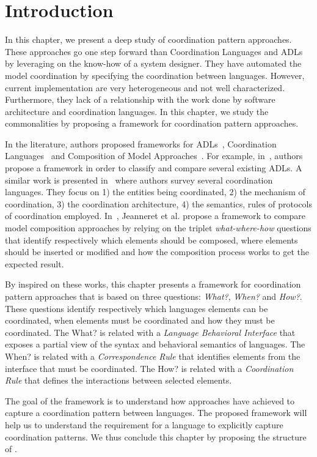 \section{Introduction}
In this chapter, we present a deep study of coordination pattern approaches. These approaches go one step forward than Coordination Languages and ADLs by leveraging on the know-how of a system designer. They have automated the model coordination by specifying the coordination between languages. However, current implementation are very heterogeneous and not well characterized. Furthermore, they lack of a relationship with the work done by software architecture and coordination languages. In this chapter, we study the commonalities by proposing a framework for coordination pattern approaches. 

In the literature, authors proposed frameworks for ADLs~\cite{frameadlsbib}, Coordination Languages~\cite{coordmodels} and Composition of Model Approaches~\cite{framecompoas}. For example, in~\cite{frameadlsbib}, authors propose a framework in order to classify and compare several existing ADLs. A similar work is presented in~\cite{coordmodels} where authors survey several coordination languages. They focus on 1) the entities being coordinated, 2) the mechanism of
coordination, 3) the coordination architecture, 4) the semantics, rules of protocols of coordination employed. In~\cite{framecompoas}, Jeanneret et al. propose a framework to compare model
composition approaches by relying on the triplet \emph{what-where-how} questions that identify respectively which elements should be composed, where elements should be inserted or modified and how the composition process works to get the expected result. 

By inspired on these works, this chapter presents a framework for coordination pattern approaches that is based on three questions: \emph{What?}, \emph{When?} and \emph{How?}. These questions identify respectively which languages elements can be coordinated, when elements must be coordinated and how they must be coordinated. The What? is related with a \emph{Language Behavioral Interface} that exposes a partial view of the syntax and behavioral semantics of languages. The When? is related with a \emph{Correspondence Rule} that identifies elements from the interface that must be coordinated. The How? is related with a \emph{Coordination Rule} that defines the interactions between selected elements. 

The goal of the framework is to understand how approaches have achieved to capture a coordination pattern between languages. The proposed framework will help us to understand the requirement for a language to explicitly capture coordination patterns. We thus conclude this chapter by proposing the structure of \bcool.  


